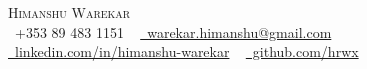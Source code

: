 \documentclass[letterpaper,11pt]{article}
\begin{document}
\begin{center}
    {\Huge \scshape Himanshu Warekar} \\ 
    \small \raisebox{-0.1\height}\faPhoneSquare\ +353 89 483 1151 ~ 
    \href{mailto:warekar.himanshu@gmail.com}{\raisebox{-0.2\height}\faEnvelope\  warekar.himanshu@gmail.com}~
    \href{https://linkedin.com/in/himanshu-warekar}{\raisebox{-0.2\height}\faLinkedin\ linkedin.com/in/himanshu-warekar}  ~
    \href{https://github.com/hrwX}{\raisebox{-0.2\height}\faGithub\ github.com/hrwx}
    \vspace{-8pt}
\end{center}
\end{document}
